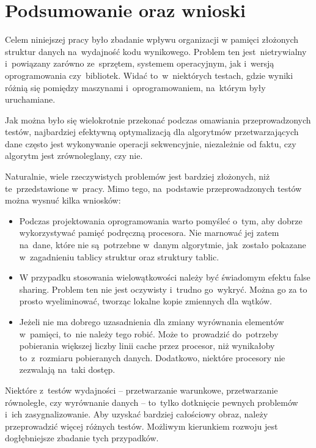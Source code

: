 \chapter{Podsumowanie oraz wnioski}
\label{cha:summary}

Celem niniejszej pracy było zbadanie wpływu organizacji w pamięci złożonych struktur danych na~wydajność kodu wynikowego. Problem ten jest~nietrywialny i~powiązany zarówno ze~sprzętem, systemem operacyjnym, jak i~wersją oprogramowania czy~bibliotek. Widać to~w~niektórych testach, gdzie wyniki różnią się pomiędzy maszynami i~oprogramowaniem, na~którym były uruchamiane.

Jak można było się wielokrotnie przekonać podczas omawiania przeprowadzonych testów, najbardziej efektywną optymalizacją dla algorytmów przetwarzających dane często jest wykonywanie operacji sekwencyjnie, niezależnie od faktu, czy algorytm jest zrównoleglany, czy nie.

Naturalnie, wiele rzeczywistych problemów jest bardziej złożonych, niż te~przedstawione w~pracy. Mimo tego, na~podstawie przeprowadzonych testów można wysnuć kilka wniosków:

\begin{itemize}
    \item Podczas projektowania oprogramowania warto pomyśleć o~tym, aby dobrze wykorzystywać pamięć podręczną procesora. Nie marnować jej zatem na~dane, które nie są~potrzebne w~danym algorytmie, jak~zostało pokazane w~zagadnieniu tablicy struktur oraz struktury tablic.
    
    \item W przypadku stosowania wielowątkowości należy być świadomym efektu false sharing. Problem ten nie jest oczywisty i~trudno go~wykryć. Można go za to prosto wyeliminować, tworząc lokalne kopie zmiennych dla wątków.
    
    \item Jeżeli nie ma dobrego uzasadnienia dla zmiany wyrównania elementów w~pamięci, to~nie należy tego robić. Może to~prowadzić do~potrzeby pobierania większej liczby linii cache przez procesor, niż wynikałoby to~z~rozmiaru pobieranych danych. Dodatkowo, niektóre procesory nie zezwalają na~taki dostęp.
\end{itemize}

Niektóre z~testów wydajności -- przetwarzanie warunkowe, przetwarzanie równoległe, czy wyrównanie danych -- to~tylko dotknięcie pewnych problemów i~ich zasygnalizowanie. Aby uzyskać bardziej całościowy obraz, należy przeprowadzić więcej różnych testów. Możliwym kierunkiem rozwoju jest dogłębniejsze zbadanie tych przypadków.

